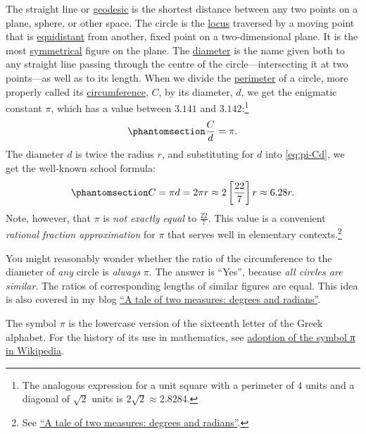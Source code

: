 \documentclass[
  a4paper,
]{article}
\begin{document}
The straight line or
\href{https://mathworld.wolfram.com/Geodesic.html}{geodesic} is the
shortest distance between any two points on a plane, sphere, or other
space. The circle is the
\href{https://en.wikipedia.org/wiki/Locus_(mathematics)}{locus}
traversed by a moving point that is
\href{https://en.wikipedia.org/wiki/Equidistant}{equidistant} from
another, fixed point on a two-dimensional plane. It is the most
\href{https://mathworld.wolfram.com/Symmetry.html}{symmetrical} figure
on the plane. The
\href{https://en.wikipedia.org/wiki/Diameter}{diameter} is the name
given both to any straight line passing through the centre of the
circle---intersecting it at two points---as well as to its length. When
we divide the \href{https://en.wikipedia.org/wiki/Perimeter}{perimeter}
of a circle, more properly called its
\href{https://en.wikipedia.org/wiki/Circumference}{circumference},
\(C\), by its diameter, \(d\), we get the enigmatic constant \(\pi\),
which has a value between \(3.141\) and \(3.142\):\footnote{The
  analogous expression for a unit square with a perimeter of \(4\) units
  and a diagonal of \(\sqrt{2}\) units is \(2\sqrt{2} \approx 2.8284\).}
\begin{equation}\phantomsection\label{eq:pi-Cd}{
\frac{C}{d} = \pi.
}\end{equation} The diameter \(d\) is twice the radius \(r\), and
substituting for \(d\) into \cref{eq:pi-Cd}, we get the well-known
school formula: \begin{equation}\phantomsection\label{eq:two-pi-r}{
C = \pi d = 2\pi r \approx 2\left[\frac{22}{7}\right]r \approx 6.28r.
}\end{equation} Note, however, that \(\pi\) is \emph{not exactly equal}
to \(\frac{22}{7}\). This value is a convenient \emph{rational fraction
approximation} for \(\pi\) that serves well in elementary
contexts.\footnote{See
  \href{https://swanlotus.netlify.app/blogs/a-tale-of-two-measures-degrees-and-radians}{``A
  tale of two measures: degrees and radians''}.}

You might reasonably wonder whether the ratio of the circumference to
the diameter of \emph{any} circle is \emph{always} \(\pi\). The answer
is ``Yes'', because \emph{all circles are similar}. The ratios of
corresponding lengths of similar figures are equal. This idea is also
covered in my blog
\href{https://swanlotus.netlify.app/blogs/a-tale-of-two-measures-degrees-and-radians}{``A
tale of two measures: degrees and radians''}.

The symbol \href{https://en.wikipedia.org/wiki/Pi}{\(\pi\)} is the
lowercase version of the sixteenth letter of the Greek alphabet. For the
history of its use in mathematics, see
\href{https://en.wikipedia.org/wiki/Pi\#Adoption_of_the_symbol_\%CF\%80}{adoption
of the symbol π in Wikipedia}.
\end{document}
